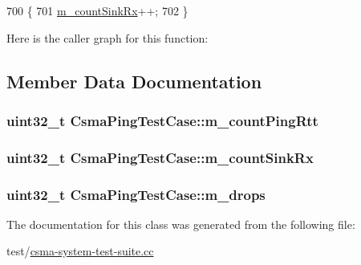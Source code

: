\begin{DoxyCode}
700 \{
701   \hyperlink{classCsmaPingTestCase_a94dad32dcfe85d5c58948e8a8f1a3af9}{m\_countSinkRx}++;
702 \}
\end{DoxyCode}


Here is the caller graph for this function\+:




\subsection{Member Data Documentation}
\subsubsection[{\texorpdfstring{m\+\_\+count\+Ping\+Rtt}{m_countPingRtt}}]{\setlength{\rightskip}{0pt plus 5cm}uint32\+\_\+t Csma\+Ping\+Test\+Case\+::m\+\_\+count\+Ping\+Rtt\hspace{0.3cm}{\ttfamily [private]}}\hypertarget{classCsmaPingTestCase_abbee80cec3b983c5abc7e2d75d489143}{}\label{classCsmaPingTestCase_abbee80cec3b983c5abc7e2d75d489143}
\subsubsection[{\texorpdfstring{m\+\_\+count\+Sink\+Rx}{m_countSinkRx}}]{\setlength{\rightskip}{0pt plus 5cm}uint32\+\_\+t Csma\+Ping\+Test\+Case\+::m\+\_\+count\+Sink\+Rx\hspace{0.3cm}{\ttfamily [private]}}\hypertarget{classCsmaPingTestCase_a94dad32dcfe85d5c58948e8a8f1a3af9}{}\label{classCsmaPingTestCase_a94dad32dcfe85d5c58948e8a8f1a3af9}
\subsubsection[{\texorpdfstring{m\+\_\+drops}{m_drops}}]{\setlength{\rightskip}{0pt plus 5cm}uint32\+\_\+t Csma\+Ping\+Test\+Case\+::m\+\_\+drops\hspace{0.3cm}{\ttfamily [private]}}\hypertarget{classCsmaPingTestCase_a5923f425c74a68a4b31b7cda31278ce5}{}\label{classCsmaPingTestCase_a5923f425c74a68a4b31b7cda31278ce5}


The documentation for this class was generated from the following file\+:\begin{DoxyCompactItemize}
\item 
test/\hyperlink{csma-system-test-suite_8cc}{csma-\/system-\/test-\/suite.\+cc}\end{DoxyCompactItemize}
